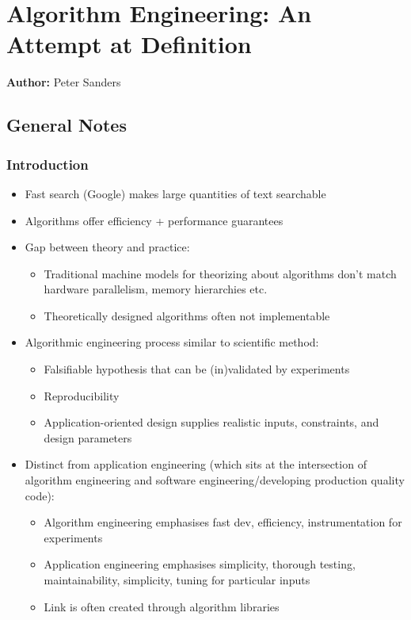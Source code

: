 \section{Algorithm Engineering: An Attempt at Definition}

\textbf{Author:} Peter Sanders

\subsection{General Notes}

\subsubsection{Introduction}

\begin{itemize}
    \item Fast search (Google) makes large quantities of text searchable
    \item Algorithms offer efficiency + performance guarantees
    \item Gap between theory and practice:
    \begin{itemize}
        \item Traditional machine models for theorizing about algorithms don't match hardware parallelism, memory hierarchies etc.
        \item Theoretically designed algorithms often not implementable
    \end{itemize}
    \item Algorithmic engineering process similar to scientific method:
    \begin{itemize}
        \item Falsifiable hypothesis that can be (in)validated by experiments
        \item Reproducibility
        \item Application-oriented design supplies realistic inputs, constraints, and design parameters
    \end{itemize}
    \item Distinct from application engineering (which sits at the intersection of algorithm engineering and software engineering/developing production quality code):
    \begin{itemize}
        \item Algorithm engineering emphasises fast dev, efficiency, instrumentation for experiments
        \item Application engineering emphasises simplicity, thorough testing, maintainability, simplicity, tuning for particular inputs
        \item Link is often created through algorithm libraries
    \end{itemize}
\end{itemize}

